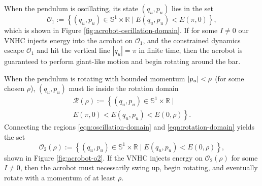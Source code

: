 \documentclass[journal,twoside,web, twocolumn,draftcls]{ieeecolor}
\DeclarePairedDelimiter{\abs}{\lvert}{\rvert}
\newcommand*{\R}{\mathbb{R}}
\newcommand*{\Sone}{\mathbb{S}^1}
\newcommand*{\SxR}{\Sone \times \R}
\begin{document}
When the pendulum is oscillating, its state \((q_u,p_u)\) lies in the set
\begin{equation}\label{eqn:oscillation-domain}
    \mathcal{O}_1 := \left\{(q_u,p_u) \in \SxR 
    \mid E(q_u,p_u) < E(\pi,0) \right\}
    ,
\end{equation}
which is shown in Figure \ref{fig:acrobot-oscillation-domain}.
If for some \(I \neq 0\) our VNHC injects energy into the acrobot on 
\(\mathcal{O}_1\), and the constrained dynamics escape
\(\mathcal{O}_1\) and hit the vertical line \(|q_u| = \pi\)
in finite time, then the acrobot is guaranteed to perform
giant-like motion and begin rotating around the bar.

When the pendulum is rotating with bounded momentum
\(\abs{p_u} < \rho\) (for some chosen \(\rho\)),
\((q_u,p_u)\) must lie inside the rotation domain
\begin{multline}\label{eqn:rotation-domain}
    \mathcal{R}(\rho) := \left\{
        (q_u,p_u) \in \SxR \mid\right.
        \\
        \left.E(\pi,0) < E(q_u,p_u) < E(0,\rho)
    \right\}
    .
\end{multline}
Connecting the regions \eqref{eqn:oscillation-domain} and
\eqref{eqn:rotation-domain} yields the set
\begin{equation}\label{eqn:o-rhobar}
    \mathcal{O}_2(\rho) := \left\{(q_u,p_u) \in \SxR
        \mid E(q_u,p_u) < E(0,\rho) \right\}
    ,
\end{equation}
shown in Figure \ref{fig:acrobot-o2}.
If the VNHC injects energy on \(\mathcal{O}_2(\rho)\) for some 
\(I \neq 0\), then the acrobot must necessarily swing up, begin rotating, 
and eventually rotate with a momentum of at least \(\rho\).
\end{document}
